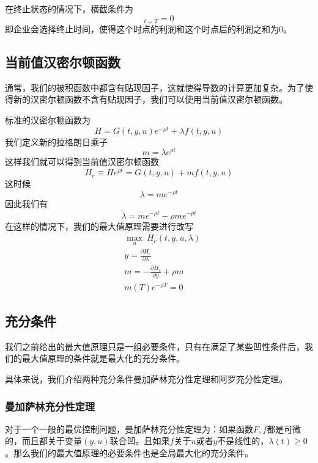 \documentclass[UTF8,12pt]{ctexart}
\numberwithin{equation}{section} %
\numberwithin{figure}{section}
\numberwithin{table}{section}
\begin{document}
	在终止状态的情况下，横截条件为
	\begin{equation}
		[H]_{t = T} = 0
	\end{equation}
	即企业会选择终止时间，使得这个时点的利润和这个时点后的利润之和为0。
	
	
	\subsection{当前值汉密尔顿函数}
	通常，我们的被积函数中都含有贴现因子，这就使得导数的计算更加复杂。为了使得新的汉密尔顿函数不含有贴现因子，我们可以使用当前值汉密尔顿函数。
	
	标准的汉密尔顿函数为
	\begin{equation}
		H = G(t,y,u)e^{-\rho t} + \lambda f (t,y,u)
	\end{equation}
	我们定义新的拉格朗日乘子
	\begin{equation}
		m = \lambda e^{\rho t}
	\end{equation}
	这样我们就可以得到当前值汉密尔顿函数
	\begin{equation}
		H_{c} \equiv He^{\rho t} = G(t,y,u) + mf(t,y,u)
	\end{equation}
	这时候
	\begin{equation}
		\lambda = me^{-\rho t}
	\end{equation}
	因此我们有
	\begin{equation}
		\dot{\lambda} = \dot{m}e^{-\rho t} - \rho m e^{-\rho t}
	\end{equation}
	在这样的情况下，我们的最大值原理需要进行改写
	\begin{equation}
		\begin{aligned}
			& \max_{u} \ H_c(t,y,u,\lambda) \\
			& \dot{y} = \frac{\partial H_c}{\partial \lambda} \\
			& \dot{m} = - \frac{\partial H_c}{\partial y} + \rho m \\
			& m(T)e^{-\rho T} = 0
		\end{aligned}
	\end{equation}
	
	\subsection{充分条件}
	我们之前给出的最大值原理只是一组必要条件，只有在满足了某些凹性条件后，我们的最大值原理的条件就是最大化的充分条件。
	
	具体来说，我们介绍两种充分条件曼加萨林充分性定理和阿罗充分性定理。
	
	\subsubsection{曼加萨林充分性定理}
	对于一个一般的最优控制问题，曼加萨林充分性定理为：如果函数$F,f$都是可微的，而且都关于变量$(y,u)$联合凹。且如果$f$关于$u$或者$y$不是线性的，$\lambda(t)\geqslant 0$。那么我们的最大值原理的必要条件也是全局最大化的充分条件。
	
\end{document}

